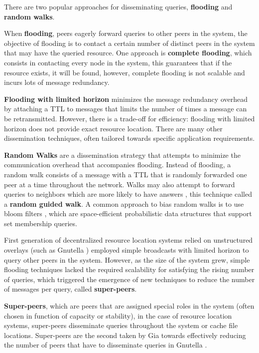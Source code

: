 There are two popular approaches for disseminating queries, \textbf{flooding} and \textbf{random walks}.

When \textbf{flooding}, peers eagerly forward queries to other peers in the system, the objective of flooding is to contact a certain number of distinct peers in the system that may have the queried resource. One approach is \textbf{complete flooding}, which consists in contacting every node in the system, this guarantees that if the resource exists, it will be found, however, complete flooding is not scalable and incurs lots of message redundancy. 

\textbf{Flooding with limited horizon} minimizes the message redundancy overhead by attaching a TTL to messages that limits the number of times a message can be retransmitted. However, there is a trade-off for efficiency: flooding with limited horizon does not provide exact resource location. There are many other dissemination techniques, often tailored towards specific application requirements.

\textbf{Random Walks} are a dissemination strategy that attempts to minimize the communication overhead that accompanies flooding. Instead of flooding, a random walk consists of a message with a TTL that is randomly forwarded one peer at a time throughout the network. Walks may also attempt to forward queries to neighbors which are more likely to have answers \cite{1022239}, this technique called a \textbf{random guided walk}. A common approach to bias random walks is to use bloom filters \cite{5751342}, which are space-efficient probabilistic data structures that support set membership queries.

First generation of decentralized resource location systems relied on unstructured overlays (such as Gnutella \cite{gnutella_gtk}) employed simple broadcasts with limited horizon to query other peers in the system. However, as the size of the system grew, simple flooding techniques lacked the required scalability for satisfying the rising number of queries, which triggered the emergence of new techniques to reduce the number of messages per query, called \textbf{super-peers}. 

\textbf{Super-peers}, which are peers that are assigned special roles in the system (often chosen in function of capacity or stability), in the case of resource location systems, super-peers disseminate queries throughout the system or cache file locations. Super-peers are the second taken by Gia \cite{Chawathe2003} towards effectively reducing the number of peers that have to disseminate queries in Gnutella \cite{gnutella_gtk}. 

